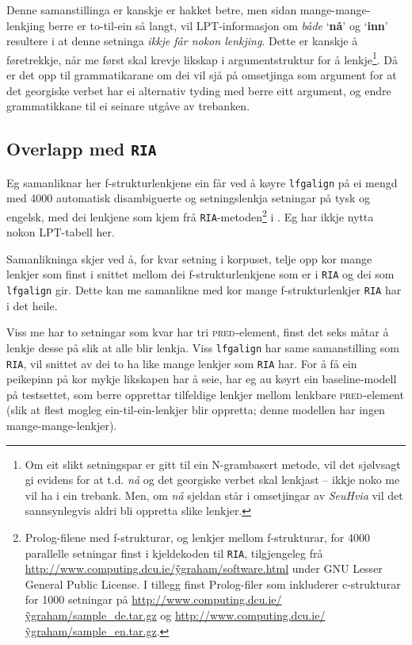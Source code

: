 \documentclass[11pt,a4paper,oneside,draft]{report}
\newcommand{\F}[2]{\textsc{#1}\ensuremath{_{#2}}}
\newcommand{\PRED}{\F{pred}{}}
\newcommand{\p}[1]{`\textbf{#1}'}
\begin{document}
Denne samanstillinga er kanskje er hakket betre, men sidan
mange-mange-lenkjing berre er to-til-ein så langt, vil LPT-informasjon
om \emph{både} \p{nå} og \p{inn} resultere i at denne setninga \emph{ikkje får nokon lenkjing}. Dette er kanskje å føretrekkje, når me først skal
krevje likskap i argumentstruktur for å lenkje\footnote{Om eit slikt setningspar er gitt til ein N-grambasert metode,
        vil det sjølvsagt gi evidens for at t.d. \emph{nå} og det georgiske
        verbet skal lenkjast -- ikkje noko me vil ha i ein
        trebank. Men, om \emph{nå} sjeldan står i omsetjingar av \emph{SeuHvia}
        vil det sannsynlegvis aldri bli oppretta slike lenkjer. }. Då er det opp
til grammatikarane om dei vil sjå på omsetjinga som argument for at
det georgiske verbet har ei alternativ tyding med berre eitt argument,
og endre grammatikkane til ei seinare utgåve av trebanken.

\subsection{Overlapp med \texttt{RIA}}
\label{sec-5.3.2}

\label{SEC:ria}

Eg samanliknar her f-strukturlenkjene ein får ved å køyre \texttt{lfgalign}
på ei mengd med 4000 automatisk disambiguerte og setningslenkja
setningar på tysk og engelsk, med dei lenkjene som kjem frå
\texttt{RIA}-metoden\footnote{Prolog-filene med f-strukturar, og lenkjer mellom
        f-strukturar, for 4000 parallelle setningar finst i
        kjeldekoden til \texttt{RIA}, tilgjengeleg frå
        \href{http://www.computing.dcu.ie/~ygraham/software.html}{http://www.computing.dcu.ie/\~ygraham/software.html} under GNU
        Lesser General Public License. I tillegg finst Prolog-filer
        som inkluderer c-strukturar for 1000 setningar på
        \href{http://www.computing.dcu.ie/~ygraham/sample_de.tar.gz}{http://www.computing.dcu.ie/\~ygraham/sample\_de.tar.gz} og
        \href{http://www.computing.dcu.ie/~ygraham/sample_en.tar.gz}{http://www.computing.dcu.ie/\~ygraham/sample\_en.tar.gz}. } i \citet{graham2009osr,graham2009fts}. Eg har
ikkje nytta nokon LPT-tabell her. 

Samanlikninga skjer ved å, for kvar setning i korpuset, telje opp kor
mange lenkjer som finst i snittet mellom dei f-strukturlenkjene som er
i \texttt{RIA} og dei som \texttt{lfgalign} gir. Dette kan me samanlikne med kor
mange f-strukturlenkjer \texttt{RIA} har i det heile.

Viss me har to setningar som kvar har tri \PRED{}-element, finst det
seks måtar å lenkje desse på slik at alle blir lenkja. Viss \texttt{lfgalign}
har same samanstilling som \texttt{RIA}, vil snittet av dei to ha like mange
lenkjer som \texttt{RIA} har. For å få ein peikepinn på kor mykje likskapen
har å seie, har eg au køyrt ein baseline-modell på testsettet, som
berre opprettar tilfeldige lenkjer mellom lenkbare \PRED{}-element
(slik at flest mogleg ein-til-ein-lenkjer blir oppretta; denne
modellen har ingen mange-mange-lenkjer).
\end{document}
